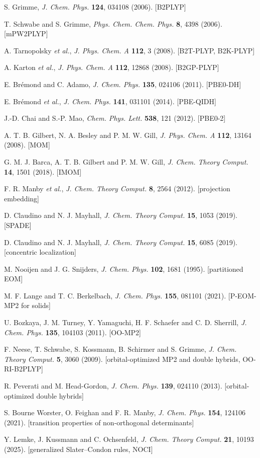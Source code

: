 \begin{enumerate}[label={[\arabic*]},resume]
  \item S. Grimme, \emph{J. Chem. Phys.} \textbf{124}, 034108 (2006). [B2PLYP]
  \item T. Schwabe and S. Grimme, \emph{Phys. Chem. Chem. Phys.} \textbf{8},
        4398 (2006). [mPW2PLYP]
  \item A. Tarnopolsky \emph{et al.}, \emph{J. Phys. Chem. A} \textbf{112}, 3
        (2008). [B2T-PLYP, B2K-PLYP]
  \item A. Karton \emph{et al.}, \emph{J. Phys. Chem. A} \textbf{112}, 12868
        (2008). [B2GP-PLYP]
  \item E. Br\'emond and C. Adamo, \emph{J. Chem. Phys.} \textbf{135}, 024106
        (2011). [PBE0-DH]
  \item E. Br\'emond \emph{et al.}, \emph{J. Chem. Phys.} \textbf{141},
        031101 (2014). [PBE-QIDH]
  \item J.-D. Chai and S.-P. Mao, \emph{Chem. Phys. Lett.} \textbf{538}, 121
        (2012). [PBE0-2]
  \item A. T. B. Gilbert, N. A. Besley and P. M. W. Gill, \emph{J. Phys.
        Chem. A} \textbf{112}, 13164 (2008). [MOM]
  \item G. M. J. Barca, A. T. B. Gilbert and P. M. W. Gill, \emph{J. Chem.
        Theory Comput.} \textbf{14}, 1501 (2018). [IMOM]
  \item F. R. Manby \emph{et al.}, \emph{J. Chem. Theory Comput.} \textbf{8},
        2564 (2012). [projection embedding]
  \item D. Claudino and N. J. Mayhall, \emph{J. Chem. Theory Comput.}
        \textbf{15}, 1053 (2019). [SPADE]
  \item D. Claudino and N. J. Mayhall, \emph{J. Chem. Theory Comput.}
        \textbf{15}, 6085 (2019). [concentric localization]
  \item M. Nooijen and J. G. Snijders, \emph{J. Chem. Phys.} \textbf{102},
        1681 (1995). [partitioned EOM]
  \item M. F. Lange and T. C. Berkelbach, \emph{J. Chem. Phys.} \textbf{155},
        081101 (2021). [P-EOM-MP2 for solids]
  \item U. Bozkaya, J. M. Turney, Y. Yamaguchi, H. F. Schaefer and
        C. D. Sherrill, \emph{J. Chem. Phys.} \textbf{135}, 104103 (2011).
        [OO-MP2]
  \item F. Neese, T. Schwabe, S. Kossmann, B. Schirmer and S. Grimme,
        \emph{J. Chem. Theory Comput.} \textbf{5}, 3060 (2009).
        [orbital-optimized MP2 and double hybrids, OO-RI-B2PLYP]
  \item R. Peverati and M. Head-Gordon, \emph{J. Chem. Phys.} \textbf{139},
        024110 (2013). [orbital-optimized double hybrids]
  \item S. Bourne Worster, O. Feighan and F. R. Manby, \emph{J. Chem. Phys.}
        \textbf{154}, 124106 (2021). [transition properties of
        non-orthogonal determinants]
  \item Y. Lemke, J. Kussmann and C. Ochsenfeld, \emph{J. Chem. Theory
        Comput.} \textbf{21}, 10193 (2025). [generalized Slater--Condon rules,
        NOCI]
\end{enumerate}
